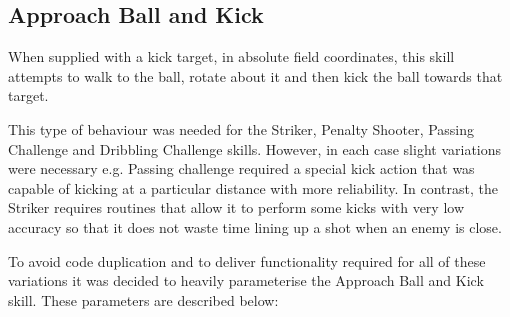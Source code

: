 \documentclass[pdftex,11pt,a4paper]{report}
\begin{document}
\subsection{Approach Ball and Kick} 
When supplied with a kick target, in absolute field coordinates, this skill attempts to walk to the ball, rotate about it and then kick the ball towards that target. 

This type of behaviour was needed for the Striker, Penalty Shooter, Passing Challenge and Dribbling Challenge skills. However, in each case slight variations were necessary e.g. Passing challenge required a special kick action that was capable of kicking at a particular distance with more reliability. In contrast, the Striker requires routines that allow it to perform some kicks with very low accuracy so that it does not waste time lining up a shot when an enemy is close.

To avoid code duplication and to deliver functionality required for all of these variations it was decided to heavily parameterise the Approach Ball and Kick skill. These parameters are described below:
\end{document}
